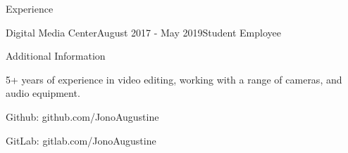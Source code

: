 \documentclass{resume} %
\begin{document}
\begin{rSection}{Experience}
\begin{rSubsection}{Digital Media Center}{August 2017 - May 2019}{Student Employee}{}
\end{rSubsection}

\end{rSection}

\begin{rSection}{Additional Information} \itemsep -3pt
\item 5+ years of experience in video editing, working with a range of cameras, and audio equipment.
\item Github: github.com/JonoAugustine
\item GitLab: gitlab.com/JonoAugustine

\end{rSection}
\end{document}
